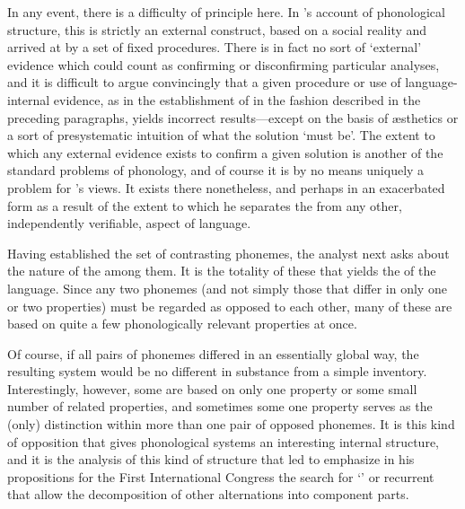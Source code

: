 In any event, there is a difficulty of principle here. In {\Trubetzkoy}'s
account of phonological structure, this is strictly an external
construct, based on a social reality and arrived at by a set of fixed
procedures. There is in fact no sort of `external' evidence which
could count as confirming or disconfirming particular analyses, and it
is difficult to argue convincingly that a given procedure or use of
language-internal evidence, as in the establishment of  in
the fashion described in the preceding paragraphs, yields incorrect
results—except on the basis of æsthetics or a sort of presystematic
intuition of what the solution `must be'. The extent to which any
external evidence exists to confirm a given solution is another of the
standard problems of phonology, and of course it is by no means
uniquely a problem for {\Trubetzkoy}'s views. It exists there
nonetheless, and perhaps in an exacerbated form as a result of the
extent to which he separates the  from any other,
independently verifiable, aspect of language.

Having established the set of contrasting phonemes, the analyst next
asks about the nature of the  among them. It is the
totality of these  that yields the  of
the language. Since any two phonemes (and not simply those that differ
in only one or two properties) must be regarded as opposed to each
other, many of these  are based on quite a few
phonologically relevant properties at once.

Of course, if all pairs of phonemes differed in an essentially global
way, the resulting system would be no different in substance from a
simple inventory. Interestingly, however, some  are based
on only one property or some small number of related properties, and
sometimes some one property serves as the (only) distinction within
more than one pair of opposed phonemes. It is this kind of opposition
that gives phonological systems an interesting internal structure, and
it is the analysis of this kind of structure that led
\citet{jakobson28:first.icl} to emphasize in his propositions for the
First International Congress the search for `' or
recurrent  that allow the decomposition of other
alternations into component parts.

